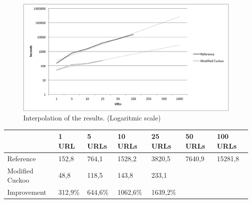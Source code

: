\begin{figure}[h]
    \centering
    \centerline{\includegraphics[width=20cm]{Images/chart-trend}}
    \caption{Interpolation of the results. (Logaritmic scale)}
    \label{fig:chart-trend}
\end{figure}

\begin{table}[h]
\begin{tabular}{@{}lllllll@{}}
\toprule
                & 1 URL   & 5 URLs  & 10 URLs     & 25 URLs     & 50 URLs     & 100 URLs \\ \midrule
Reference       & 152,8   & 764,1   & 1528,2      & 3820,5      & 7640,9      & 15281,8 \\
Modified Cuckoo & 48,8    & 118,5   & 143,8       & 233,1       &             &         \\
Improvement     & 312,9\% & 644,6\% & 1062,6\%    & 1639,2\%    &             &         \\ \bottomrule
\end{tabular}
\end{table}
